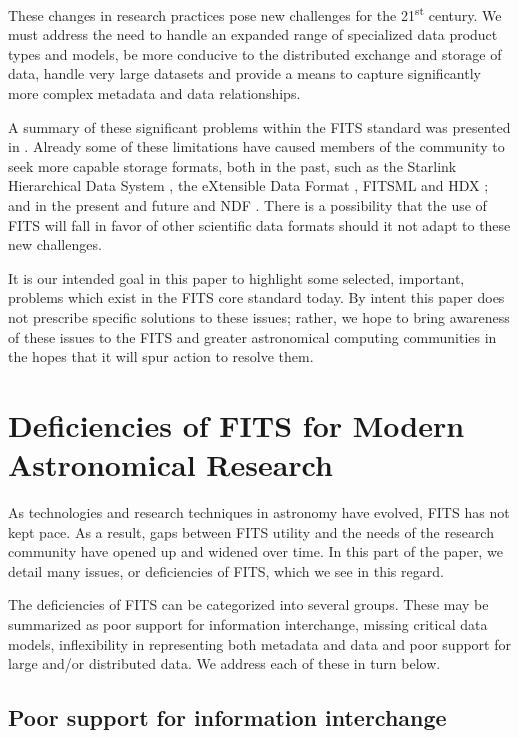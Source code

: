\documentclass[final,authoryear,5p,times,twocolumn]{elsarticle}
\begin{document}
These changes in research practices pose new challenges for the
21\textsuperscript{st} century. We must address the need to handle an
expanded range of specialized data product types and models, be more
conducive to the distributed exchange and storage of data, handle very
large datasets and provide a means to capture significantly more complex
metadata and data relationships.


A summary of these significant problems within the FITS standard was
presented in \citet{P90_adassxxiii}.  Already some of these limitations
have caused members of the community to seek more capable storage
formats, both in the past, such as the Starlink Hierarchical Data System
\citep[HDS;][]{1982QJRAS..23..485D}, the eXtensible Data Format
\citep[XDF;][]{2001ASPC..238..217S}, FITSML \citep{2001ASPC..238..487T}
and HDX \citep{2003ASPC..295..221G}; and in the present and future
\citep[e.g. HDF5, ][]{2011ASPC..442...53A} and NDF
\citep{P91_adassxxiii}.  There is a possibility that the use of FITS
will fall in favor of other scientific data formats should it not adapt
to these new challenges.


It is our intended goal in this paper to highlight some selected,
important, problems which exist in the FITS core standard today.
By intent this paper does not prescribe specific solutions to these issues;
rather, we hope to bring awareness of these issues to the FITS and greater
astronomical computing communities in the hopes that
it will spur action to resolve them.

\section{Deficiencies of FITS for Modern Astronomical Research}


As technologies and research techniques in astronomy have evolved, FITS
has not kept pace. As a result, gaps between FITS utility and the
needs of the research community have opened up and widened over time. In
this part of the paper, we detail many issues, or deficiencies of FITS,
which we see in this regard.


The deficiencies of FITS can be categorized into several groups.
These may be summarized as poor support for information
interchange, missing critical data models, inflexibility in
representing both metadata and data and poor support for large and/or
distributed data. We address each of these in turn below.

\subsection{Poor support for information interchange}
\end{document}
